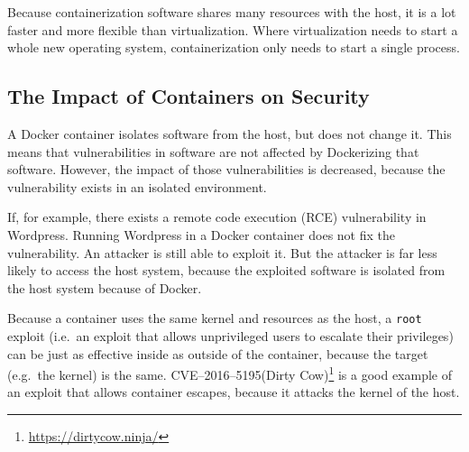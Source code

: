 
Because containerization software shares many resources with the host, it is a lot faster and more flexible than virtualization. Where virtualization needs to start a whole new operating system, containerization only needs to start a single process.

\subsection{The Impact of Containers on Security}
A Docker container isolates software from the host, but does not change it. This means that vulnerabilities in software are not affected by Dockerizing that software. However, the impact of those vulnerabilities is decreased, because the vulnerability exists in an isolated environment.

If, for example, there exists a remote code execution (RCE) vulnerability in Wordpress. Running Wordpress in a Docker container does not fix the vulnerability. An attacker is still able to exploit it. But the attacker is far less likely to access the host system, because the exploited software is isolated from the host system because of Docker.

\medskip

Because a container uses the same kernel and resources as the host, a \lstinline{root} exploit (i.e.\ an exploit that allows unprivileged users to escalate their privileges) can be just as effective inside as outside of the container, because the target (e.g.\ the kernel) is the same. CVE--2016--5195(Dirty Cow)\footnote{\url{https://dirtycow.ninja/}} is a good example of an exploit that allows container escapes\cite{Dirty-Cow-Escape}, because it attacks the kernel of the host.
